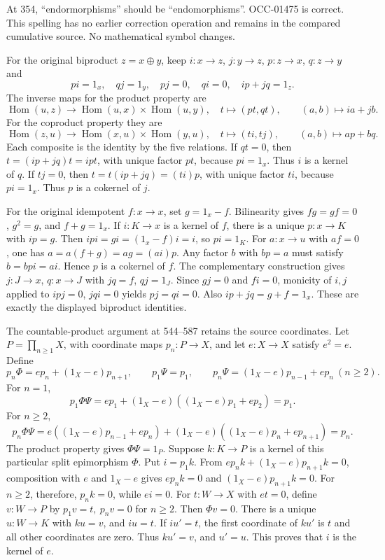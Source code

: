 \documentclass[11pt]{article}
\begin{document}
At 354, ``endormorphisms'' should be ``endomorphisms''. OCC-01475 is correct. This spelling has no earlier correction operation and remains in the compared cumulative source. No mathematical symbol changes.

For the original biproduct \(z=x\oplus y\), keep \(i:x\to z\), \(j:y\to z\), \(p:z\to x\), \(q:z\to y\) and \[
pi=1_x,\quad qj=1_y,\quad pj=0,\quad qi=0,\quad ip+jq=1_z.
\] The inverse maps for the product property are \[
\operatorname{Hom}(u,z)\longrightarrow
\operatorname{Hom}(u,x)\times\operatorname{Hom}(u,y),\quad
t\longmapsto(pt,qt),\qquad (a,b)\longmapsto ia+jb.
\] For the coproduct property they are \[
\operatorname{Hom}(z,u)\longrightarrow
\operatorname{Hom}(x,u)\times\operatorname{Hom}(y,u),\quad
t\longmapsto(ti,tj),\qquad (a,b)\longmapsto ap+bq.
\] Each composite is the identity by the five relations. If \(qt=0\), then \(t=(ip+jq)t=ipt\), with unique factor \(pt\), because \(pi=1_x\). Thus \(i\) is a kernel of \(q\). If \(tj=0\), then \(t=t(ip+jq)=(ti)p\), with unique factor \(ti\), because \(pi=1_x\). Thus \(p\) is a cokernel of \(j\).

For the original idempotent \(f:x\to x\), set \(g=1_x-f\). Bilinearity gives \(fg=gf=0\), \(g^2=g\), and \(f+g=1_x\). If \(i:K\to x\) is a kernel of \(f\), there is a unique \(p:x\to K\) with \(ip=g\). Then \(ipi=gi=(1_x-f)i=i\), so \(pi=1_K\). For \(a:x\to u\) with \(af=0\), one has \(a=a(f+g)=ag=(ai)p\). Any factor \(b\) with \(bp=a\) must satisfy \(b=bpi=ai\). Hence \(p\) is a cokernel of \(f\). The complementary construction gives \(j:J\to x\), \(q:x\to J\) with \(jq=f\), \(qj=1_J\). Since \(gj=0\) and \(fi=0\), monicity of \(i,j\) applied to \(ipj=0\), \(jqi=0\) yields \(pj=qi=0\). Also \(ip+jq=g+f=1_x\). These are exactly the displayed biproduct identities.

The countable-product argument at 544--587 retains the source coordinates. Let \(P=\prod_{n\geq1}X\), with coordinate maps \(p_n:P\to X\), and let \(e:X\to X\) satisfy \(e^2=e\). Define \[
p_n\Phi=e p_n+(1_X-e)p_{n+1},\qquad
p_1\Psi=p_1,\qquad
p_n\Psi=(1_X-e)p_{n-1}+e p_n\ (n\geq2).
\] For \(n=1\), \[
p_1\Phi\Psi=e p_1+(1_X-e)((1_X-e)p_1+e p_2)=p_1.
\] For \(n\geq2\), \[
p_n\Phi\Psi
=e((1_X-e)p_{n-1}+e p_n)
 +(1_X-e)((1_X-e)p_n+e p_{n+1})=p_n.
\] The product property gives \(\Phi\Psi=1_P\). Suppose \(k:K\to P\) is a kernel of this particular split epimorphism \(\Phi\). Put \(i=p_1k\). From \(e p_nk+(1_X-e)p_{n+1}k=0\), composition with \(e\) and \(1_X-e\) gives \(e p_nk=0\) and \((1_X-e)p_{n+1}k=0\). For \(n\geq2\), therefore, \(p_nk=0\), while \(ei=0\). For \(t:W\to X\) with \(et=0\), define \(v:W\to P\) by \(p_1v=t,\ p_nv=0\) for \(n\geq2\). Then \(\Phi v=0\). There is a unique \(u:W\to K\) with \(ku=v\), and \(iu=t\). If \(iu'=t\), the first coordinate of \(ku'\) is \(t\) and all other coordinates are zero. Thus \(ku'=v\), and \(u'=u\). This proves that \(i\) is the kernel of \(e\).
\end{document}
